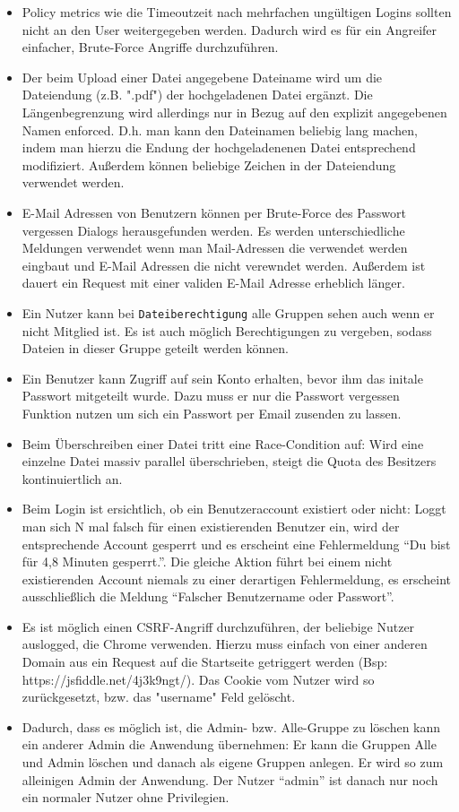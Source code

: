 \documentclass[12pt,DIV14,BCOR10mm,a4paper,parskip=half-,headsepline,headinclude,english,ngerman,bibliography=totocnumbered]{scrreprt}
\begin{document}
\begin{itemize}
  \item Policy metrics wie die Timeoutzeit nach mehrfachen ungültigen Logins sollten nicht an den User weitergegeben werden. Dadurch wird es für ein Angreifer einfacher, Brute-Force Angriffe durchzuführen. \autocite[Loc. 5087]{book:wahh}
  \item Der beim Upload einer Datei angegebene Dateiname wird um die Dateiendung (z.B. ".pdf") der hochgeladenen Datei ergänzt. Die Längenbegrenzung wird allerdings nur in Bezug auf den explizit angegebenen Namen enforced. D.h. man kann den Dateinamen beliebig lang machen, indem man hierzu die Endung der hochgeladenenen Datei entsprechend modifiziert. Außerdem können beliebige Zeichen in der Dateiendung verwendet werden.
  \item E-Mail Adressen von Benutzern können per Brute-Force des Passwort vergessen Dialogs herausgefunden werden. Es werden unterschiedliche Meldungen verwendet wenn man Mail-Adressen die verwendet werden eingbaut und E-Mail Adressen die nicht verewndet werden. Außerdem ist dauert ein Request mit einer validen E-Mail Adresse erheblich länger.
  \item Ein Nutzer kann bei \texttt{Dateiberechtigung} alle Gruppen sehen auch wenn er nicht Mitglied ist. Es ist auch möglich Berechtigungen zu vergeben, sodass Dateien in dieser Gruppe geteilt werden können.
\item Ein Benutzer kann Zugriff auf sein Konto erhalten, bevor ihm das initale Passwort mitgeteilt wurde. Dazu muss er nur die Passwort vergessen Funktion nutzen um sich ein Passwort per Email zusenden zu lassen.
\item Beim Überschreiben einer Datei tritt eine Race-Condition auf: Wird eine einzelne Datei massiv parallel überschrieben, steigt die Quota des Besitzers kontinuiertlich an.
\item Beim Login ist ersichtlich, ob ein Benutzeraccount existiert oder nicht: Loggt man sich N mal falsch für einen existierenden Benutzer ein, wird der entsprechende Account gesperrt und es erscheint eine Fehlermeldung \enquote{Du bist für 4,8 Minuten gesperrt.}. Die gleiche Aktion führt bei einem nicht existierenden Account niemals zu einer derartigen Fehlermeldung, es erscheint ausschließlich die Meldung \enquote{Falscher Benutzername oder Passwort}.
\item Es ist möglich einen CSRF-Angriff durchzuführen, der beliebige Nutzer auslogged, die Chrome verwenden. Hierzu muss einfach von einer anderen Domain aus ein Request auf die Startseite getriggert werden (Bsp: https://jsfiddle.net/4j3k9ngt/). Das Cookie vom Nutzer wird so zurückgesetzt, bzw. das "username" Feld gelöscht.
\item Dadurch, dass es möglich ist, die Admin- bzw. Alle-Gruppe zu löschen kann ein anderer Admin die Anwendung übernehmen: Er kann die Gruppen Alle und Admin löschen und danach als eigene Gruppen anlegen. Er wird so zum alleinigen Admin der Anwendung. Der Nutzer \enquote{admin} ist danach nur noch ein normaler Nutzer ohne Privilegien.
\end{itemize}
\end{document}
